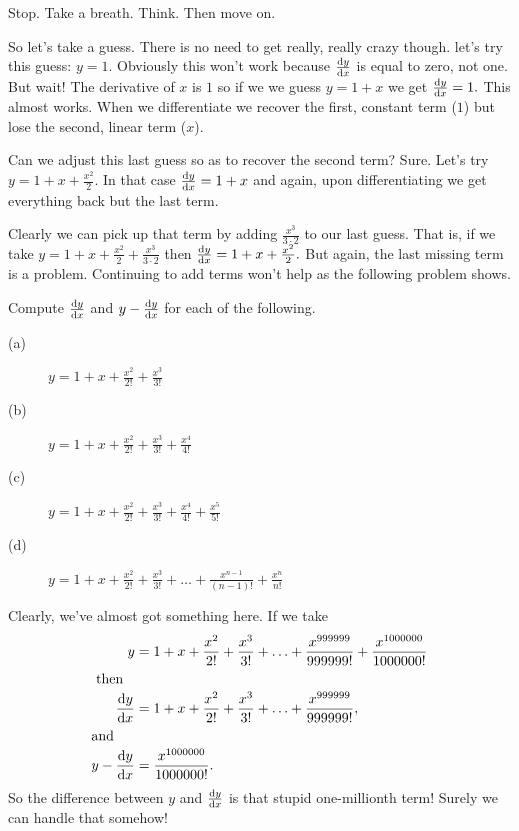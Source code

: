 Stop. Take a breath.  Think. Then move on.

So let's take a guess. There is no need to get really, really crazy
though. let's try this guess: $y = 1.$ Obviously this won't work
because $\frac{\text{d}{y}}{\text{d}{x}}$ is equal to zero, not one. But wait! The
derivative of $x$ is $1$ so if we we guess $y=1+x$ we get $\frac{\text{d}{y}}{\text{d}{x}}
= 1.$ This almost works.  When we differentiate we recover the first, constant
term ($1$) but lose the second, linear term ($x$).

Can we adjust this last guess so as to recover the second term?
Sure. Let's try $y=1+x+\frac{x^2}{2}.$ In that case $\frac{\text{d}{y}}{\text{d}{x}} =
1+x$ and again, upon differentiating we get everything back but the
last term. 

Clearly we can pick up that term by adding $\frac{x^3}{3\cdot2}$ to
our last guess. That is, if we take
$y=1+x+\frac{x^2}{2}+\frac{x^3}{3\cdot2}$ then $\frac{\text{d}{y}}{\text{d}{x}} =
1+x+\frac{x^2}{2}.$ But again, the last missing term is a
problem. Continuing to add terms won't help as the following problem
shows. 

\begin{embeddedproblem}{}
Compute $\frac{\text{d}{y}}{\text{d}{x}}$ and $y-\frac{\text{d}{y}}{\text{d}{x}}$ for each of the following.
  \begin{multicols}{2}
    \begin{description}
    \item[(a)] $y= 1+x+\frac{x^2}{2!}+\frac{x^3}{3!}$
    \item[(b)] $y= 1+x+\frac{x^2}{2!}+\frac{x^3}{3!}+\frac{x^4}{4!}$
    \item[(c)]
      $y= 1+x+\frac{x^2}{2!}+\frac{x^3}{3!}+\frac{x^4}{4!}+\frac{x^5}{5!}$
    \item[(d)]
      $y= 1+x+\frac{x^2}{2!}+\frac{x^3}{3!} + \ldots +
      \frac{x^{n-1}}{(n-1)!} + \frac{x^n}{n!}$
    \end{description}
  \end{multicols}
\end{embeddedproblem}

  Clearly, we've almost got something here. If we take
  \begin{align*}
   y&= 1+x+\frac{x^2}{2!}+\frac{x^3}{3!} + \ldots +
  \frac{x^{999999}}{999999!} +   \frac{x^{1000000}}{1000000!} \\
\intertext{  then}
  \frac{\text{d}{y}}{\text{d}{x}} &= 1+x+\frac{x^2}{2!}+\frac{x^3}{3!} + \ldots +
  \frac{x^{999999}}{999999!}, \\
\intertext{and}
    y-\frac{\text{d}{y}}{\text{d}{x}} &= \frac{x^{1000000}}{1000000!}.
  \end{align*}
  So the  difference between $y$ and $\frac{\text{d}{y}}{\text{d}{x}}$ is that stupid
  one-millionth term! Surely we can handle that somehow!

